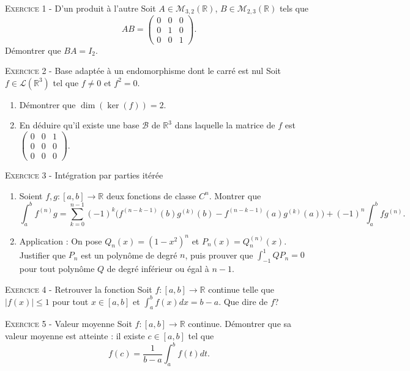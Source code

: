 \documentclass[11pt]{article}
\begin{document}
 

\begin{center}\textsc{{\huge }}\end{center}



\vskip0.3cm\noindent\textsc{Exercice 1} - D'un produit à l'autre
\vskip0.2cm
Soit $A\in\mathcal M_{3,2}(\mathbb R)$, $B\in\mathcal M_{2,3}(\mathbb R)$ tels que 
$$AB=\left(
\begin{array}{ccc}
0&0&0\\
0&1&0\\
0&0&1
\end{array}
\right).$$
Démontrer que $BA=I_2$.




\vskip0.3cm\noindent\textsc{Exercice 2} - Base adaptée à un endomorphisme dont le carré est nul
\vskip0.2cm
Soit $f\in\mathcal L(\mathbb R^3)$ tel que $f\neq 0$ et $f^2=0$.
\begin{enumerate}
\item Démontrer que $\dim(\ker(f))=2$.
\item En déduire qu'il existe une base $\mathcal B$ de $\mathbb R^3$ dans laquelle la matrice de $f$ est $\begin{pmatrix}0&0&1\\0&0&0\\0&0&0\end{pmatrix}$. 
\end{enumerate}




\vskip0.3cm\noindent\textsc{Exercice 3} - Intégration par parties itérée
\vskip0.2cm
\begin{enumerate}
\item Soient $f,g:[a,b]\to\mathbb R$ deux fonctions de classe $C^n$. Montrer que
$$\int_{a}^b f^{(n)}g=\sum_{k=0}^{n-1}(-1)^k \big(f^{(n-k-1)}(b)g^{(k)}(b)-f^{(n-k-1)}(a)g^{(k)}(a)\big)+(-1)^n \int_a^b fg^{(n)}.$$
\item Application : On pose $Q_n(x)=(1-x^2)^n$ et $P_n(x)=Q_n^{(n)}(x)$. Justifier que $P_n$ est un polynôme de degré $n$, puis prouver
que $\int_{-1}^1 QP_n=0$ pour tout polynôme $Q$ de degré inférieur ou égal à $n-1$.
\end{enumerate}




\vskip0.3cm\noindent\textsc{Exercice 4} - Retrouver la fonction
\vskip0.2cm
Soit $f:[a,b]\to\mathbb R$ continue telle que $|f(x)|\leq 1$ pour tout $x\in[a,b]$
et $\int_a^b f(x)dx=b-a$. Que dire de $f$?




\vskip0.3cm\noindent\textsc{Exercice 5} - Valeur moyenne
\vskip0.2cm
Soit $f:[a,b]\to\mathbb R$ continue. Démontrer que sa valeur moyenne est atteinte : il existe $c\in [a,b]$ tel que 
$$f(c)=\frac{1}{b-a}\int_a^b f(t)dt.$$




\vskip0.5cm

\end{document}
